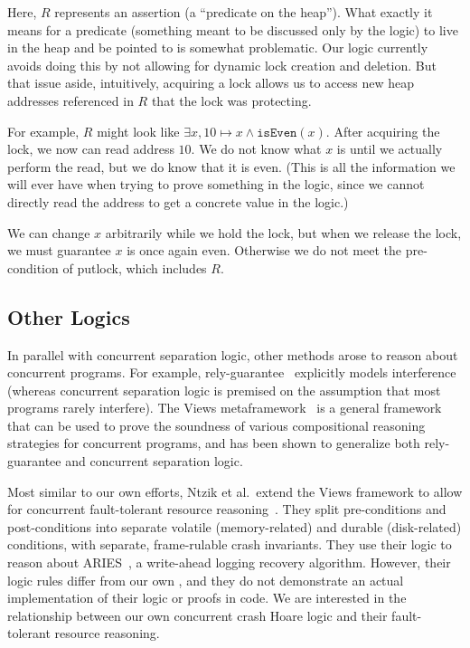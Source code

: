 Here, $R$ represents an assertion (a ``predicate on the heap'').
What exactly it means for a predicate (something meant to be
discussed only by the logic) to live in the heap and be pointed to
is somewhat problematic.
Our logic currently
avoids doing this by not allowing for dynamic lock creation and
deletion.
But
that issue aside, intuitively, acquiring a lock allows us to access new heap
addresses referenced in $R$ that the lock was protecting.

For example, $R$ might look like $\exists x, 10\mapsto x \wedge
\texttt{isEven}(x)$.
After acquiring the lock, we now can read address $10$.
We do not know what $x$ is until we actually perform the read, but we do know
that it is even.
(This is all the information we will ever have when
trying to prove something in the logic, since we cannot directly read the
address to get a concrete value in the logic.)

We can change $x$ arbitrarily while we hold the lock, but when we
release the lock, we must guarantee $x$ is once again even.
Otherwise we do
not meet the pre-condition of putlock, which includes $R$.

\subsection{Other Logics}

In parallel with concurrent separation logic, other methods arose to
reason about concurrent programs.
For example,
rely-guarantee~\cite{jones1981development} explicitly models interference
(whereas concurrent separation logic is premised on the assumption that most
programs rarely interfere).
The Views metaframework~\cite{dinsdale2013views} is a
general framework that can be used to prove the soundness of various
compositional reasoning strategies for concurrent programs, and has been shown
to generalize both rely-guarantee and concurrent separation logic.

Most similar to our own efforts, Ntzik et al.\ extend the Views framework to
allow for concurrent fault-tolerant resource reasoning~\cite{ntzik2015fault}.
They split pre-conditions and post-conditions into separate volatile
(memory-related) and durable (disk-related) conditions, with separate,
frame-rulable crash invariants.
They use their logic to reason about
ARIES~\cite{ntzik2015fault}, a write-ahead logging recovery algorithm.
However,
their logic rules differ from our own , and they do not demonstrate an actual
implementation of their logic or proofs in code.
We are interested in the
relationship between our own concurrent crash Hoare logic and their
fault-tolerant resource reasoning.

